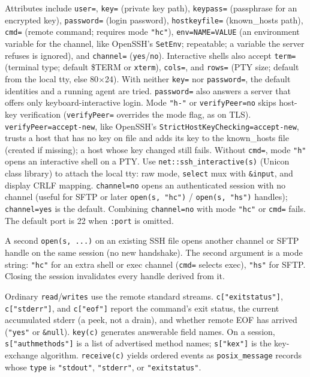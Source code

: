 Attributes include \texttt{user=},
\texttt{key=} (private key path), \texttt{keypass=} (passphrase for an
encrypted key), \texttt{password=} (login password),
\texttt{hostkeyfile=} (known\_hosts path), \texttt{cmd=} (remote
command; requires mode \texttt{"hc"}), \texttt{env=NAME=VALUE} (an
environment variable for the channel, like OpenSSH's \texttt{SetEnv};
repeatable; a variable the server refuses is ignored), and \texttt{channel=} (\texttt{yes}/\texttt{no}). Interactive
shells also accept \texttt{term=} (terminal type; default \$TERM or
\texttt{xterm}), \texttt{cols=}, and \texttt{rows=} (PTY size; default
from the local tty, else 80$\times$24). With neither
\texttt{key=} nor \texttt{password=}, the default identities and a
running agent are tried. \texttt{password=} also answers a server that
offers only keyboard-interactive login. Mode \texttt{"h-"} or \texttt{verifyPeer=no}
skips host-key verification (\texttt{verifyPeer=} overrides the mode
flag, as on TLS). \texttt{verifyPeer=accept-new}, like OpenSSH's
\texttt{StrictHostKeyChecking=accept-new}, trusts a host that has no
key on file and adds its key to the known\_hosts file (created if
missing); a host whose key changed still fails.
Without \texttt{cmd=}, mode \texttt{"h"} opens an interactive shell on a PTY.
Use \texttt{net::ssh\_interactive(s)} (Unicon class library) to attach
the local tty: raw mode, \texttt{select} mux with \texttt{\&input}, and
display CRLF mapping. \texttt{channel=no} opens an authenticated session with no channel
(useful for SFTP or later \texttt{open(s, "hc")} / \texttt{open(s, "hs")} handles);
\texttt{channel=yes} is the default. Combining \texttt{channel=no} with
mode \texttt{"hc"} or \texttt{cmd=} fails. The default port is 22 when \texttt{:port} is
omitted.

A second \texttt{open(s, ...)} on an existing SSH file opens another
channel or SFTP handle on the same session (no new handshake). The
second argument is a mode string: \texttt{"hc"} for an extra
shell or exec channel (\texttt{cmd=} selects exec), \texttt{"hs"} for
SFTP. Closing the session invalidates every handle derived from it.


Ordinary \texttt{read}/\texttt{writes} use the remote standard streams.
\texttt{c["exitstatus"]}, \texttt{c["stderr"]}, and
\texttt{c["eof"]} report the command's exit status, the current
accumulated stderr (a peek, not a drain), and whether remote EOF has arrived
(\texttt{"yes"} or \texttt{\&null}).
\texttt{key(c)} generates answerable field names.
On a session, \texttt{s["authmethods"]} is a list of advertised
method names; \texttt{s["kex"]} is the key-exchange algorithm.
\texttt{receive(c)} yields ordered events as
\texttt{posix\_message} records whose \texttt{type} is
\texttt{"stdout"}, \texttt{"stderr"}, or \texttt{"exitstatus"}.

